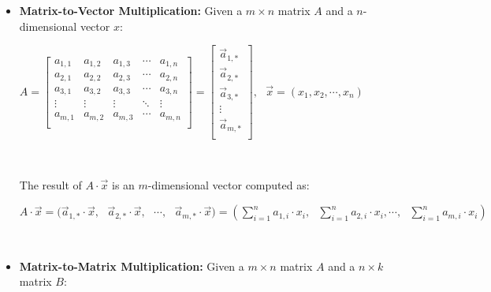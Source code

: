\begin{tcolorbox}[title={\textbf{\tboxdef{\ref*{subsec:matrix-arithmetic}} Matrix Arithmetic}}]

\begin{itemize}
\item \textbf{Matrix-to-Vector Multiplication:} Given a $m \times n$ matrix $A$ and a $n$-dimensional vector $x$: 


$A = \begin{bmatrix}
 a_{1, 1} & a_{1, 2} & a_{1, 3} & \cdots & a_{1, n}\\
 a_{2, 1} & a_{2, 2} & a_{2, 3} & \cdots & a_{2, n} \\
 a_{3, 1} & a_{3, 2} & a_{3, 3} & \cdots & a_{3, n} \\
\vdots & \vdots & \vdots & \ddots & \vdots \\
 a_{m, 1} & a_{m, 2} & a_{m, 3} & \cdots & a_{m, n} \\
\end{bmatrix} = \begin{bmatrix} 
\vec{a}_{1, * } \\ 
\vec{a}_{2, * } \\ 
\vec{a}_{3, * } \\ 
\vdots\\
\vec{a}_{m, * } \\ 
\end{bmatrix}, \text{ } \vec{x} = (x_1, x_2, \cdots, x_{n})$


$ $

The result of $A \cdot \vec{x}$ is an $m$-dimensional vector computed as:

$A \cdot \vec{x} = \Big(\vec{a}_{1, * } \cdot \vec{x}, \text{ } \vec{a}_{2, * } \cdot \vec{x}, \text{ }\cdots,\text{ } \vec{a}_{m, * } \cdot \vec{x} \Big) = \left(\sum\limits_{i=1}^{n} a_{1, i} \cdot  x_i, \text{ } \sum\limits_{i=1}^{n}  a_{2, i} \cdot x_i,\cdots, \text{ } \sum\limits_{i=1}^{n} a_{m, i} \cdot x_i \right)$


$ $


\item \textbf{Matrix-to-Matrix Multiplication:} Given a $m \times n$ matrix $A$ and a $n \times k$ matrix $B$: 




\end{itemize}
\end{tcolorbox}
